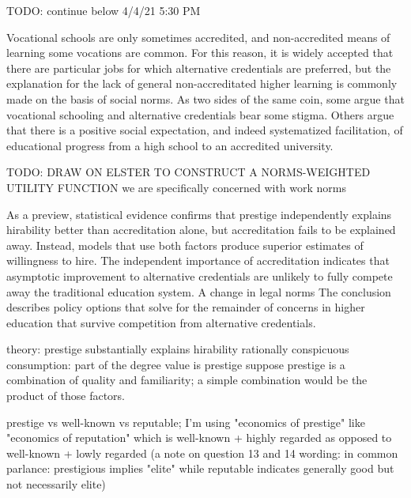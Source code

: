 \documentclass[review]{elsarticle}
\begin{document}
TODO: continue below 4/4/21 5:30 PM

Vocational schools are only sometimes accredited, and non-accredited means of learning some vocations are common.
For this reason, it is widely accepted that there are particular jobs for which alternative credentials are preferred,
but the explanation for the lack of general non-accreditated higher learning is commonly made on the basis of social norms.
As two sides of the same coin, some argue that vocational schooling and alternative credentials bear some stigma.
Others argue that there is a positive social expectation, and indeed systematized facilitation,
of educational progress from a high school to an accredited university.


TODO: DRAW ON ELSTER TO CONSTRUCT A NORMS-WEIGHTED UTILITY FUNCTION
we are specifically concerned with work norms


As a preview, statistical evidence confirms that prestige independently explains hirability better than accreditation alone,
but accreditation fails to be explained away.
Instead, models that use both factors produce superior estimates of willingness to hire.
The independent importance of accreditation indicates that asymptotic improvement to alternative credentials
are unlikely to fully compete away the traditional education system.
A change in legal norms 
The conclusion describes policy options that solve for the remainder of concerns in higher education that survive competition from alternative credentials.


theory: prestige substantially explains hirability
rationally conspicuous consumption: part of the degree value is prestige
suppose prestige is a combination of quality and familiarity; a simple combination would be the product of those factors.

prestige vs well-known vs reputable; I'm using "economics of prestige" like "economics of reputation"
which is well-known + highly regarded
as opposed to well-known + lowly regarded
(a note on question 13 and 14 wording:
in common parlance: prestigious implies "elite" while reputable indicates generally good but not necessarily elite)
\end{document}
